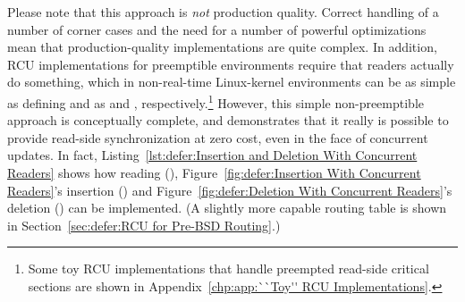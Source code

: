 Please note that this approach is \emph{not} production quality.
Correct handling of a number of corner cases and the need for a number
of powerful optimizations mean that production-quality implementations
are quite complex.
In addition, RCU implementations for preemptible environments
require that readers actually do something, which in non-real-time
Linux-kernel environments can be as simple as defining
 and  as 
and , respectively.\footnote{
	Some toy RCU implementations that handle preempted
	read-side critical sections are shown in
	Appendix~\ref{chp:app:``Toy'' RCU Implementations}.}
However, this simple non-preemptible approach is conceptually complete,
and demonstrates that it really is possible to provide read-side
synchronization at zero cost, even in the face of concurrent updates.
In fact,
Listing~\ref{lst:defer:Insertion and Deletion With Concurrent Readers}
shows how reading (),
Figure~\ref{fig:defer:Insertion With Concurrent Readers}'s
insertion () and
Figure~\ref{fig:defer:Deletion With Concurrent Readers}'s
deletion () can
be implemented.
(A slightly more capable routing table is shown in
Section~\ref{sec:defer:RCU for Pre-BSD Routing}.)


